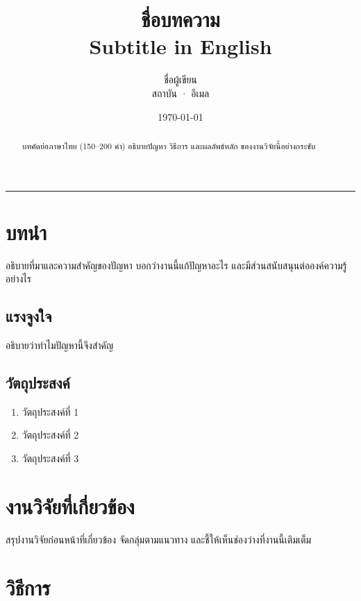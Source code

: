 \documentclass[10pt,a4paper]{article}
\title{\textbf{ชื่อบทความ}\\[6pt]
  {\large Subtitle in English}}
\author{ชื่อผู้เขียน\\
  {\small สถาบัน · อีเมล}}
\date{\today}
\begin{document}
\maketitle

\begin{abstract}
บทคัดย่อภาษาไทย (150--200 คำ) อธิบายปัญหา วิธีการ และผลลัพธ์หลัก
ของงานวิจัยนี้อย่างกระชับ
\end{abstract}

\noindent\rule{\textwidth}{0.5pt}
\vspace{8pt}

\section{บทนำ}

อธิบายที่มาและความสำคัญของปัญหา บอกว่างานนี้แก้ปัญหาอะไร
และมีส่วนสนับสนุนต่อองค์ความรู้อย่างไร

\subsection{แรงจูงใจ}

อธิบายว่าทำไมปัญหานี้จึงสำคัญ

\subsection{วัตถุประสงค์}

\begin{enumerate}[nosep]
  \item วัตถุประสงค์ที่ 1
  \item วัตถุประสงค์ที่ 2
  \item วัตถุประสงค์ที่ 3
\end{enumerate}

\section{งานวิจัยที่เกี่ยวข้อง}

สรุปงานวิจัยก่อนหน้าที่เกี่ยวข้อง จัดกลุ่มตามแนวทาง
และชี้ให้เห็นช่องว่างที่งานนี้เติมเต็ม

\section{วิธีการ}
\end{document}
